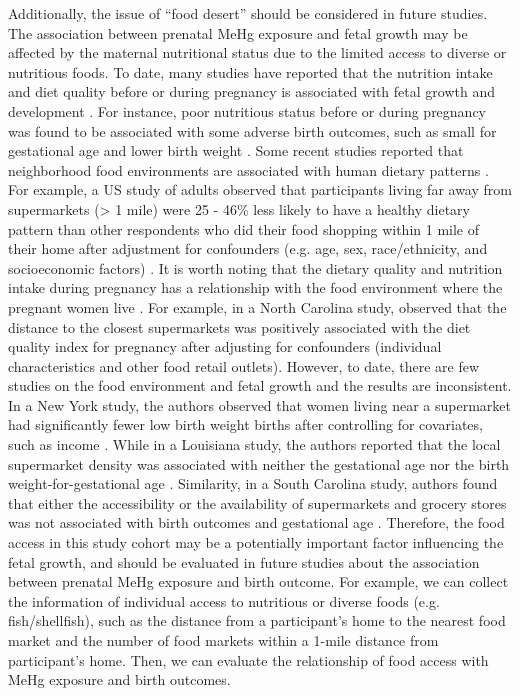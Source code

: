 Additionally, the issue of ``food desert'' should be considered in future studies. The association between prenatal MeHg exposure and fetal growth may be affected by the maternal nutritional status due to the limited access to diverse or nutritious foods. To date, many studies have reported that the nutrition intake and diet quality before or during pregnancy is associated with fetal growth and development \citep{institute1990nutrition,wu2004maternal}. For instance, poor nutritious status before or during pregnancy was found to be associated with some adverse birth outcomes, such as small for gestational age \citep{mitchell2004maternal} and lower birth weight \citep{sram2005impact}. Some recent studies reported that neighborhood food environments are associated with human dietary patterns \citep{walker2010disparities}. For example, a US study of adults observed that participants living far away from supermarkets (> 1 mile) were 25 - 46\% less likely to have a healthy dietary pattern than other respondents who did their food shopping within 1 mile of their home after adjustment for confounders (e.g. age, sex, race/ethnicity, and socioeconomic factors) \citep{moore2006associations}. It is worth noting that the dietary quality and nutrition intake during pregnancy has a relationship with the food environment where the pregnant women live \citep{laraia2004proximity}. For example, in a North Carolina study, \cite{laraia2004proximity} observed that the distance to the closest supermarkets was positively associated with the diet quality index for pregnancy after adjusting for confounders (individual characteristics and other food retail outlets). However, to date, there are few studies on the food environment and fetal growth and the results are inconsistent. In a New York study, the authors observed that women living near a supermarket had significantly fewer low birth weight births after controlling for covariates, such as income \citep{lane2008structural}. While in a Louisiana study, the authors reported that the local supermarket density was associated with neither the gestational age nor the birth weight-for-gestational age \citep{farley2006relationship}. Similarity, in a South Carolina study, authors found that either the accessibility or the availability of supermarkets and grocery stores was not associated with birth
outcomes and gestational age \citep{ma2016neighborhood}. Therefore, the food access in this study cohort may be a potentially important factor influencing the fetal growth, and should be evaluated in future studies about the association between prenatal MeHg exposure and birth outcome. For example, we can collect the information of individual access to nutritious or diverse foods (e.g. fish/shellfish), such as the distance from a participant's home to the nearest food market and the number of food markets within a 1-mile distance from participant's home. Then, we can evaluate the relationship of food access with MeHg exposure and birth outcomes.

